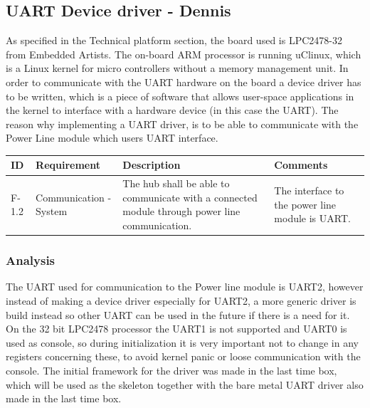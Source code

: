 \subsection{UART Device driver - Dennis} 
As specified in the Technical platform section, the board used is LPC2478-32 from Embedded Artists. The on-board ARM processor is running uClinux, which is a Linux kernel for micro controllers without a memory management unit. In order to communicate with the UART hardware on the board a device driver has to be written, which is a piece of software that allows user-space applications in the kernel to interface with a hardware device (in this case the UART). The reason why implementing a UART driver, is to be able to communicate with the Power Line module which users UART interface. 
\begin{table}[H]
\centering
	\begin{tabular}{|p{1.2cm}|p{2.3cm}|p{6cm}|p{6cm}|}
	\hline
	ID		& Requirement		& Description												& Comments\\\hline
	F-1.2		& Communication - System & The hub shall be able to communicate with a connected module through power line communication. & The interface to the power line module is UART.\\\hline
	\end{tabular}
\end{table}
\subsubsection{Analysis}
The UART used for communication to the Power line module is UART2, however instead of making a device driver especially for UART2, a more generic driver is build instead so other UART can be used in the future if there is a need for it. 
\p On the 32 bit LPC2478 processor the UART1 is not supported and UART0 is used as console, so during initialization it is very important not to change in any registers concerning these, to avoid kernel panic or loose communication with the console.
\p The initial framework for the driver was made in the last time box, which will be used as the skeleton together with the bare metal UART driver also made in the last time box. 

%
